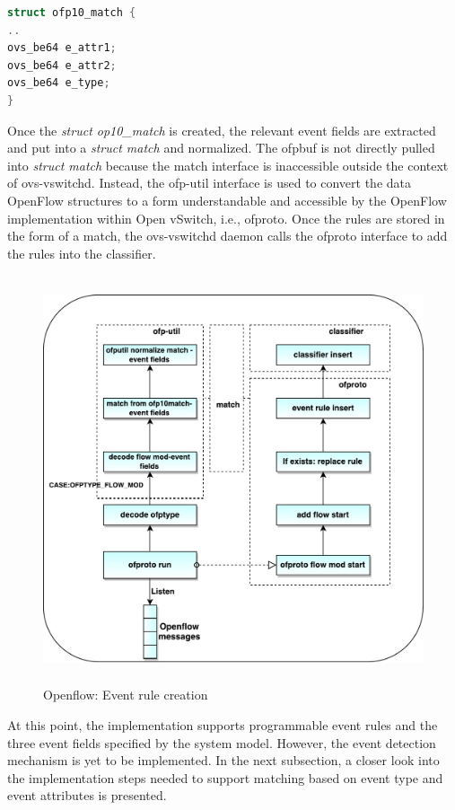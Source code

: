 \begin{lstlisting}[language=c]
struct ofp10_match {
..
ovs_be64 e_attr1;
ovs_be64 e_attr2;
ovs_be64 e_type;
}
\end{lstlisting}

Once the \textit{struct op10_match} is created, the relevant event fields are extracted and put into a \textit{struct match} and normalized. The ofpbuf is not directly pulled into \textit{struct match} because the match interface is inaccessible outside the context of ovs-vswitchd. Instead, the ofp-util interface is used to convert the data OpenFlow structures to a form understandable and accessible by the OpenFlow implementation within Open vSwitch, i.e., ofproto. Once the rules are stored in the form of a match, the ovs-vswitchd daemon calls the ofproto interface to add the rules into the classifier.

\begin{figure}[H]
 \centering
 \caption{Openflow: Event rule creation}
 \includegraphics[height=12cm,width=14cm]{ruleinsert.pdf}
\end{figure}

At this point, the implementation supports programmable event rules and the three event fields specified by the system model. However, the event detection mechanism is yet to be implemented. In the next subsection, a closer look into the implementation steps needed to support matching based on event type and event attributes is presented.

